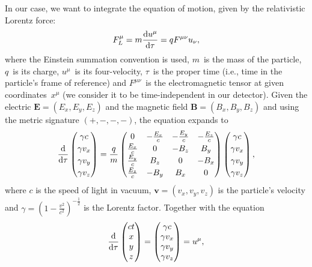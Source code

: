 		In our case, we want to integrate the equation of motion, given by the relativistic Lorentz force:
			\begin{equation}
				F^\mu_L = m\derivative{u^\mu}{\tau} = q F^{\mu\nu}u_{\nu},
			\end{equation}
		where the Einstein summation convention is used, $m$~is the mass of the particle, $q$~is its charge, $u^\mu$~is its four-velocity, $\tau$~is the proper time (i.e., time in the particle's frame of reference) and $F^{\mu\nu}$~is the electromagnetic tensor at given coordinates~$x^\mu$ (we consider it to be time-independent in our detector). Given the electric $\mathbf{E} = (E_x,E_y,E_z)$ and the magnetic field $\mathbf{B} = (B_x,B_y,B_z)$ and using the metric signature $(+,-,-,-)$, the equation expands to
			\begin{equation}
				\renewcommand{\arraystretch}{1.2}
				\derivative{}{\tau} \begin{pmatrix}\gamma c\\ \gamma v_x\\ \gamma v_y\\ \gamma v_z\end{pmatrix} = \frac{q}{m} 
				\begin{pmatrix}
					0             & -\frac{E_x}{c} & -\frac{E_y}{c} & -\frac{E_z}{c} \\
					\frac{E_x}{c} &  0             & -B_z           &  B_y           \\
					\frac{E_y}{c} &  B_z           &  0             & -B_x           \\
					\frac{E_z}{c} & -B_y           &  B_x           &  0
				\end{pmatrix}
				\begin{pmatrix}\gamma c\\ \gamma v_x\\ \gamma v_y\\ \gamma v_z\end{pmatrix},
				\renewcommand{\arraystretch}{1}
			\end{equation}
		where $c$ is the speed of light in vacuum, $\mathbf{v} = (v_x,v_y,v_z)$ is the particle's velocity and $\gamma = \left(1-\frac{v^2}{c^2}\right)^{-\frac{1}{2}}$ is the Lorentz factor. Together with the equation
			\begin{equation}
				\derivative{}{\tau} \begin{pmatrix} ct\\ x\\ y\\ z\end{pmatrix} = \begin{pmatrix}\gamma c\\ \gamma v_x\\ \gamma v_y\\ \gamma v_z\end{pmatrix} = u^\mu,
			\end{equation}

